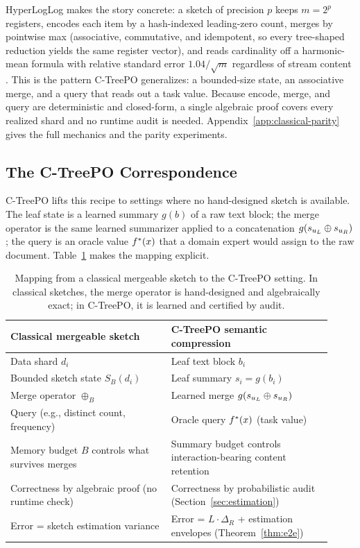 HyperLogLog makes the story concrete: a sketch of precision $p$ keeps
$m = 2^p$ registers, encodes each item by a hash-indexed
leading-zero count, merges by pointwise max (associative, commutative,
and idempotent, so every tree-shaped reduction yields the same register
vector), and reads cardinality off a harmonic-mean formula with
relative standard error $1.04/\sqrt{m}$ regardless of stream content
\citep{FlajoletEtAl2007}. This is the pattern C-TreePO generalizes: a
bounded-size state, an associative merge, and a query that reads out a
task value. Because encode, merge, and query are deterministic and
closed-form, a single algebraic proof covers every realized shard and
no runtime audit is needed. Appendix~\ref{app:classical-parity} gives
the full mechanics and the parity experiments.

\subsection{The C-TreePO Correspondence}

C-TreePO lifts this recipe to settings where no hand-designed sketch is
available. The leaf state is a learned summary $g(b)$ of a raw text block;
the merge operator is the same learned summarizer applied to a
concatenation $g(s_{u_L} \oplus s_{u_R})$; the query is an oracle value
$f^\ast(x)$ that a domain expert would assign to the raw document.
Table~\ref{tab:sketch-mapping} makes the mapping explicit.

\begin{table}[htbp]
    \centering
    \small
    \begin{tabular}{p{0.46\linewidth}p{0.46\linewidth}}
        \toprule
        Classical mergeable sketch & C-TreePO semantic compression \\
        \midrule
        Data shard $d_i$ & Leaf text block $b_i$ \\
        Bounded sketch state $S_B(d_i)$ & Leaf summary $s_i = g(b_i)$ \\
        Merge operator $\oplus_B$ & Learned merge $g(s_{u_L}\oplus s_{u_R})$ \\
        Query (e.g., distinct count, frequency) & Oracle query $f^\ast(x)$ (task value) \\
        Memory budget $B$ controls what survives merges & Summary budget controls interaction-bearing content retention \\
        Correctness by algebraic proof (no runtime check) & Correctness by probabilistic audit (Section~\ref{sec:estimation}) \\
        Error = sketch estimation variance & Error = $L \cdot \Delta_R$ + estimation envelopes (Theorem~\ref{thm:e2e}) \\
        \bottomrule
    \end{tabular}
    \caption{Mapping from a classical mergeable sketch to the C-TreePO setting. In classical sketches, the merge operator is hand-designed and algebraically exact; in C-TreePO, it is learned and certified by audit.}
    \label{tab:sketch-mapping}
\end{table}

